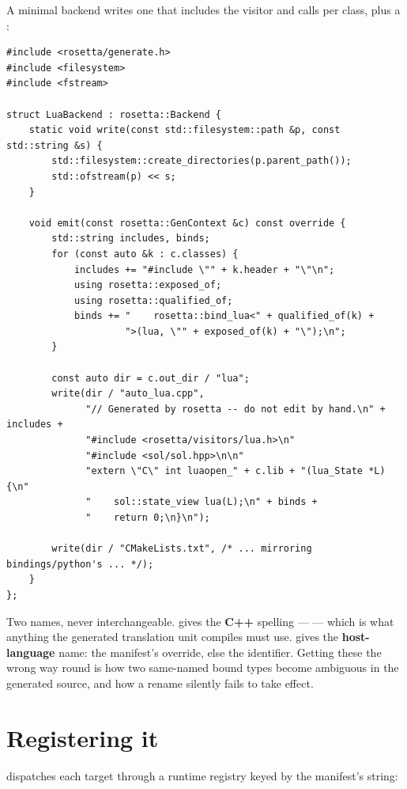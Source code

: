A minimal backend writes one  that includes the visitor and calls
 per class, plus a :

\begin{lstlisting}[style=cpp]
#include <rosetta/generate.h>
#include <filesystem>
#include <fstream>

struct LuaBackend : rosetta::Backend {
    static void write(const std::filesystem::path &p, const std::string &s) {
        std::filesystem::create_directories(p.parent_path());
        std::ofstream(p) << s;
    }

    void emit(const rosetta::GenContext &c) const override {
        std::string includes, binds;
        for (const auto &k : c.classes) {
            includes += "#include \"" + k.header + "\"\n";
            using rosetta::exposed_of;
            using rosetta::qualified_of;
            binds += "    rosetta::bind_lua<" + qualified_of(k) +
                     ">(lua, \"" + exposed_of(k) + "\");\n";
        }

        const auto dir = c.out_dir / "lua";
        write(dir / "auto_lua.cpp",
              "// Generated by rosetta -- do not edit by hand.\n" + includes +
              "#include <rosetta/visitors/lua.h>\n"
              "#include <sol/sol.hpp>\n\n"
              "extern \"C\" int luaopen_" + c.lib + "(lua_State *L) {\n"
              "    sol::state_view lua(L);\n" + binds +
              "    return 0;\n}\n");

        write(dir / "CMakeLists.txt", /* ... mirroring bindings/python's ... */);
    }
};
\end{lstlisting}

\begin{warn}
Two names, never interchangeable.  gives the
\textbf{C++} spelling ---  --- which is what anything the
generated translation unit compiles must use.  gives the
\textbf{host-language} name: the manifest's  override, else the
identifier. Getting these the wrong
way round is how two same-named bound types become ambiguous in the generated
source, and how a rename silently fails to take effect.
\end{warn}

\section{Registering it}

 dispatches each target through a runtime registry keyed
by the manifest's  string:

